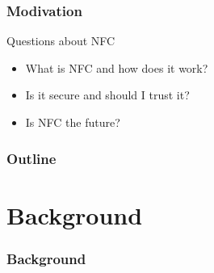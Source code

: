 \documentclass[unknownkeysallowed]{beamer}
\begin{document}
\begin{frame}
\frametitle{Modivation}
  \begin{center}
    \begin{minipage}{.7\textwidth}
  	 \begin{block}{Questions about NFC}
        \begin{itemize}
  		    \item{What is NFC and how does it work?}
  		    \item{Is it secure and should I trust it?}
  		    \item{Is NFC the future?}
     		\end{itemize}
     \end{block}
    \end{minipage}
  \end{center}
\end{frame}

\begin{frame}
  \frametitle{Outline}
    \begin{center}\begin{minipage}{.9\textwidth}
        \tableofcontents[
          currentsection,
          sectionstyle=show/show,
          subsectionstyle=show/shaded/hide
        ]
    \end{minipage}\end{center}
 \end{frame}


\Fontix

\section{Background}
\begin{frame}
  \frametitle{Background}
    \begin{center}\begin{minipage}{.9\textwidth}
    \tableofcontents[currentsubsection, hideothersubsections, sectionstyle=show/shaded]
    \end{minipage}\end{center}
\end{frame}
%
\end{document}
